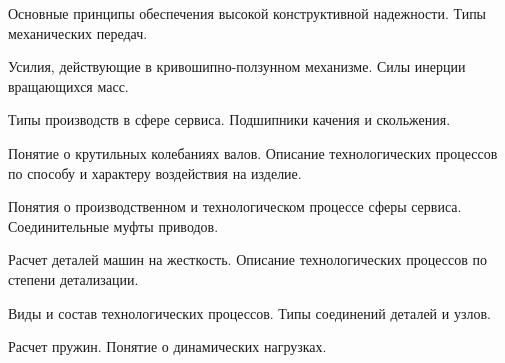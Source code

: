 \documentclass[
	14pt,
	a4paper,
	]
	{scrartcl}
\begin{document}
\vfill

\newpage


\shapk
{}
\setcounter{zad}{0}

\vfill
\z Основные принципы обеспечения высокой конструктивной надежности.
 \vfill
\z Типы механических передач.
 \vfill

\vfill

\newpage


\shapk
{}
\setcounter{zad}{0}

\vfill
\z Усилия, действующие в кривошипно-ползунном механизме.
 \vfill
\z Силы инерции вращающихся масс.
 \vfill

\vfill

\newpage


\shapk
{}
\setcounter{zad}{0}

\vfill
\z Типы производств в сфере сервиса.
 \vfill
\z Подшипники качения и скольжения.
 \vfill

\vfill

\newpage


\shapk
{}
\setcounter{zad}{0}

\vfill
\z Понятие о крутильных колебаниях валов.
 \vfill
\z Описание технологических процессов по способу и характеру воздействия на изделие.
 \vfill

\vfill

\newpage


\shapk
{}
\setcounter{zad}{0}

\vfill
\z Понятия о производственном и технологическом процессе сферы сервиса.
 \vfill
\z Соединительные муфты приводов.
 \vfill

\vfill

\newpage


\shapk
{}
\setcounter{zad}{0}

\vfill
\z Расчет деталей машин на жесткость.
 \vfill
\z Описание технологических процессов по степени детализации.
 \vfill

\vfill

\newpage


\shapk
{}
\setcounter{zad}{0}

\vfill
\z Виды и состав технологических процессов.
 \vfill
\z Типы соединений деталей и узлов.
 \vfill

\vfill

\newpage


\shapk
{}
\setcounter{zad}{0}

\vfill
\z Расчет пружин.
 \vfill
\z Понятие о динамических нагрузках.
 \vfill

\vfill

\newpage
\end{document}
